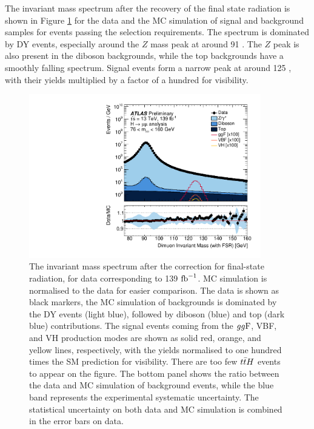 The invariant mass spectrum after the recovery of the final
state radiation is shown in Figure \ref{fig:hmumu:sel-mmumu} for the data and
the MC simulation of signal and background samples for events
passing the selection requirements. The spectrum is dominated by DY
events, especially around the $Z$ mass peak at around 91 \GeV.
The $Z$ peak is also present in the diboson backgrounds, while
the top backgrounds have a smoothly falling spectrum.
Signal events form a narrow peak at around 125 \GeV, with their yields
multiplied by a factor of a hundred for visibility.
\begin{figure}[h!]
  \centering
  \includegraphics[width=0.9\textwidth]{figures/hmumu/sel-mmumu}
  \caption[Dimuon invariant mass spectrum of selected events]{
  The invariant mass spectrum after the correction for
  final-state radiation, for data corresponding to 139 $\text{fb}^{-1}$.
  MC simulation is normalised to the data for easier comparison.
  The data is shown as black markers, the MC simulation of backgrounds
  is dominated by the DY events (light blue),
  followed by diboson (blue) and top (dark blue) contributions.
  The signal events coming from the $gg\text{F}$, VBF, and VH production
  modes are shown as solid red, orange, and yellow lines,
  respectively, with the yields normalised to one hundred times the
  SM prediction for visibility. There are too few $t\bar{t} H$ events to appear
  on the figure. The bottom panel shows the ratio between the data
  and MC simulation of background events, while the blue band
  represents the experimental systematic uncertainty. The statistical
  uncertainty on both data and MC simulation is combined in the
  error bars on data.
  }
  \label{fig:hmumu:sel-mmumu}
\end{figure}

